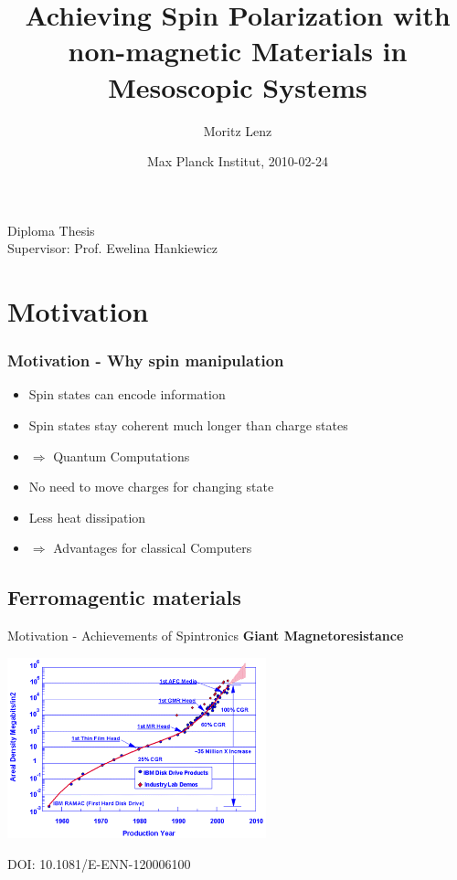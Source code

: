 \documentclass{beamer}
\title{Achieving Spin Polarization with non-magnetic Materials in Mesoscopic
Systems}
\author{Moritz Lenz}
\institute{Institut für Theoretische Physik und Astrophysik, Universität
Würzburg}
\date{Max Planck Institut, 2010-02-24}
\begin{document}
\begin{frame}
  \titlepage

  \begin{center}
{ 	
	 Diploma Thesis\\[1.5em]
}
    Supervisor: Prof. Ewelina Hankiewicz

\end{center}

%

\end{frame}

\section{Motivation}

\begin{frame}
    \frametitle{Motivation - Why spin manipulation}

	\begin{itemize}
		\item Spin states can encode information
		\item Spin states stay coherent much longer than charge states
        \item $\Rightarrow$ Quantum Computations
            \pause
        \item No need to move charges for changing state
        \item Less heat dissipation
        \item $\Rightarrow$ Advantages for classical Computers
	\end{itemize}

\end{frame}

\subsection{Ferromagentic materials}

\begin{frame}{Motivation - Achievements of Spintronics}
        \textbf{Giant Magnetoresistance}

    \includegraphics[width=75mm]{storage-density.png}

    \footnotesize DOI: 10.1081/E-ENN-120006100
\end{frame}
\end{document}
